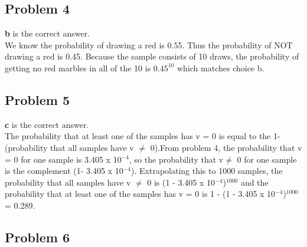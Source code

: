 \documentclass[12 pt]{article}
\begin{document}
	\subsection*{Problem 4}
	
	\textbf{b} is the correct answer.\\
	We know the probability of drawing a red is 0.55. Thus the probability of NOT drawing a red is 0.45. Because the sample consists of 10 draws, the probability of getting no red marbles in all of the 10 is $0.45^{10}$ which matches choice b.
	
	\subsection*{Problem 5}
		
	\textbf{c} is the correct answer.\\
	The probability that at least one of the samples has v = 0 is equal to the 1- (probability that all samples have v $\neq$ 0).From problem 4, the probability that v = 0 for one sample is 3.405 x 10$^{-4}$, so the probability that v$\neq$ 0 for one sample is the complement (1- 3.405 x 10$^{-4}$). Extrapolating this to 1000 samples, the probability that all samples have v $\neq$ 0 is (1 - 3.405 x 10$^{-4}$)$^{1000}$ and the probability that at least one of the samples has v = 0 is 1 - (1 - 3.405 x 10$^{-4}$)$^{1000}$ = 0.289.
	
	\subsection*{Problem 6}
	
\end{document}

